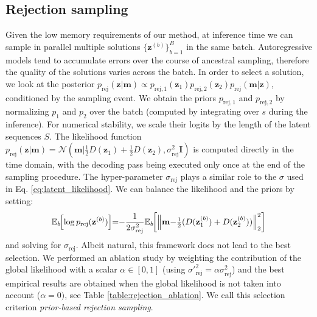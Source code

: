 \documentclass[a4paper]{article}
\begin{document}
\subsection{Rejection sampling}

Given the low memory requirements of our method, at inference time we can sample in parallel multiple solutions $\{\mathbf{z}^{(b)}\}_{b=1}^{B}$ in the same batch. Autoregressive models tend to accumulate errors over the course of ancestral sampling, therefore the quality of the solutions varies across the batch. 
In order to select a solution, we look at the posterior $p_{\text{rej}}(\mathbf{z}\vert\mathbf{m}) \propto p_{\text{rej},1}(\mathbf{z}_1)p_{\text{rej},2}(\mathbf{z}_2)p_{\text{rej}}(\mathbf{m}\vert\mathbf{z})$, conditioned by the sampling event. We obtain the priors $p_{\text{rej},1}$ and $p_{\text{rej},2}$ by normalizing $p_1$ and $p_2$ over the batch (computed by integrating over $s$ during the inference). For numerical stability, we scale their logits by the length of the latent sequences $S$. The likelihood function $p_{\text{rej}}(\mathbf{z}\vert\mathbf{m}) = \mathcal{N}\left(\mathbf{m}\big\vert \tfrac{1}{2}D(\mathbf{z}_1) + \tfrac{1}{2}D(\mathbf{z}_2), \sigma_{\text{rej}}^2\mathbf{I}\right)$ is computed directly in the time domain, with the decoding pass being executed only once at the end of the sampling procedure. The hyper-parameter $\sigma_{\text{rej}}$ plays a similar role to the $\sigma$ used in Eq. \eqref{eq:latent_likelihood}. We can balance the likelihood and the priors by setting:
\begin{equation*}
    \mathbb{E}_{b}\hspace{-0.1cm}\left[\log p_{\text{rej}}(\mathbf{z}^{(b)})\right] \hspace{-0.1cm}=\hspace{-0.1cm} -\frac{1}{2\sigma_{\text{rej}}^2} \mathbb{E}_{b}\hspace{-0.1cm}\left[
               \left\lVert \mathbf{m} \hspace{-0.08cm}- \hspace{-0.08cm}
               \tfrac{1}{2}(D(\mathbf{z}^{(b)}_1) + D(\mathbf{z}^{(b)}_2))
               \right\rVert^2_2
           \right]
\end{equation*} and solving for $\sigma_\text{rej}$. Albeit natural, this framework does not lead to the best selection. We performed an ablation study by weighting the contribution of the global likelihood with a scalar $\alpha \in [0, 1]$ (using ${{\sigma'}}_{\text{rej}}^2 = \alpha \sigma^2_{\text{rej}} $) and the best empirical results are obtained when the global likelihood is not taken into account ($\alpha = 0)$, see Table \ref{table:rejection_ablation}.  We call this selection criterion \textit{prior-based rejection sampling}.
\end{document}
